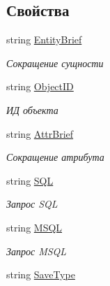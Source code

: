 \subsection*{Свойства}
\begin{DoxyCompactItemize}
\item 
string \mbox{\hyperlink{class_f_b_a_1_1_sys_d_b_edit_adeb4184205de5251176a05fb3103002f}{Entity\+Brief}}
\begin{DoxyCompactList}\small\item\em Сокращение сущности \end{DoxyCompactList}\item 
string \mbox{\hyperlink{class_f_b_a_1_1_sys_d_b_edit_af647d0263d8b61fdf559797c3e503550}{Object\+ID}}
\begin{DoxyCompactList}\small\item\em ИД объекта \end{DoxyCompactList}\item 
string \mbox{\hyperlink{class_f_b_a_1_1_sys_d_b_edit_a67f0d8cf7653dfe7fb11851461f30471}{Attr\+Brief}}
\begin{DoxyCompactList}\small\item\em Сокращение атрибута \end{DoxyCompactList}\item 
string \mbox{\hyperlink{class_f_b_a_1_1_sys_d_b_edit_a01aa80df320ef07c05b309ff775e6299}{S\+QL}}
\begin{DoxyCompactList}\small\item\em Запрос S\+QL \end{DoxyCompactList}\item 
string \mbox{\hyperlink{class_f_b_a_1_1_sys_d_b_edit_aa06663e1062ce9cafbd46081b97cc4a3}{M\+S\+QL}}
\begin{DoxyCompactList}\small\item\em Запрос M\+S\+QL \end{DoxyCompactList}\item 
string \mbox{\hyperlink{class_f_b_a_1_1_sys_d_b_edit_abf2f3971a2805ea00e87fa08559df60f}{Save\+Type}}

\end{DoxyCompactItemize}
